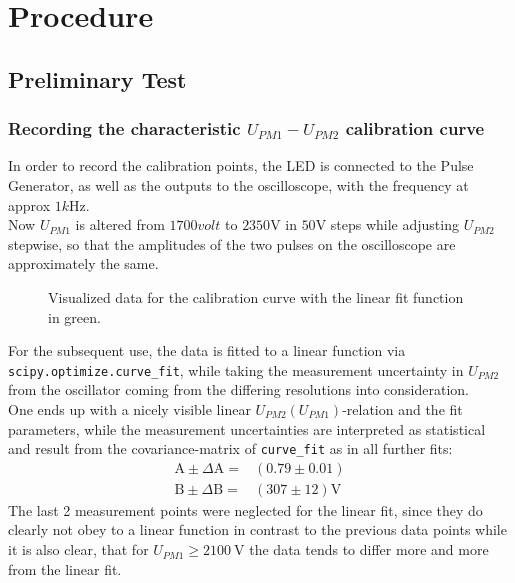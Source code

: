 \documentclass[english,  %
parskip=full,   %
headsepline]{scrartcl}
\begin{document}
\section{Procedure}\label{Procedure}
\subsection{Preliminary Test}
\subsubsection{Recording the characteristic $U_{PM1}-U_{PM2}$ calibration curve}
In order to record the calibration points, the LED is connected to the Pulse Generator, as well as the outputs to the oscilloscope, with the frequency at approx $1\si{k\hertz}$.\\
Now $U_{PM1}$ is altered from $1700 \si{volt}$ to $2350\si{\volt}$ in $50\si{\volt}$ steps while adjusting $U_{PM2}$ stepwise, so that the amplitudes of the two pulses on the oscilloscope are approximately the same.
\begin{figure}[H]
    \centering
    
    \caption{Visualized data for the calibration curve with the linear fit function in green.}
    \label{fig:vorversuch1}
\end{figure}
For the subsequent use, the data is fitted to a linear function via\\ \verb+scipy.optimize.curve_fit+, while taking the measurement uncertainty in $U_{PM2}$ from the oscillator coming from the differing resolutions into consideration.\\
One ends up with a nicely visible linear $U_{PM2}(U_{PM1})$-relation and the fit parameters, while the measurement uncertainties are interpreted as statistical and result from the covariance-matrix of \verb+curve_fit+ as in all further fits:
\begin{align*}
\text{A} \pm \Delta \text{A}=&(0.79\pm0.01)\\
\text{B} \pm \Delta \text{B}=&(307\pm12)\si{\volt}
\end{align*}
The last 2 measurement points were neglected for the linear fit, since they do clearly not obey to a linear function in contrast to the previous data points while it is also clear, that for $U_{PM1} \ge \SI{2100}{\volt}$ the data tends to differ more and more from the linear fit.
\end{document}
